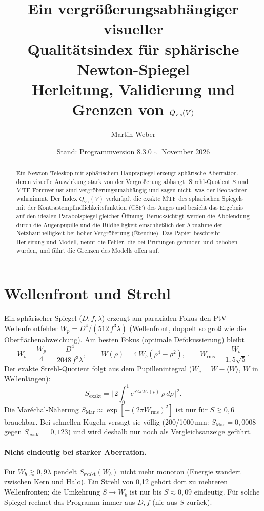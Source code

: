 \documentclass[11pt,a4paper]{article}
\title{Ein vergrößerungsabhängiger visueller\\Qualitätsindex für sphärische Newton-Spiegel\\[4pt]
\large Herleitung, Validierung und Grenzen von $\Qvis(V)$}
\author{Martin Weber}
\date{Stand: Programmversion 8.3.0 \quad$\cdot$\quad 8.\ November 2026}
\newcommand{\Qvis}{Q_{\mathrm{vis}}}
\begin{document}
\RaggedRight
\setlength{\parindent}{0pt}\setlength{\parskip}{4pt}
\maketitle

\begin{abstract}\RaggedRight
Ein Newton-Teleskop mit sphärischem Hauptspiegel erzeugt sphärische Aberration, deren visuelle Auswirkung stark von der Vergrößerung abhängt. Strehl-Quotient $S$ und MTF-Formverlust sind vergrößerungsunabhängig und sagen nicht, was der Beobachter wahrnimmt. Der Index $\Qvis(V)$ verknüpft die exakte MTF des sphärischen Spiegels mit der Kontrastempfindlichkeitsfunktion (CSF) des Auges und bezieht das Ergebnis auf den idealen Parabolspiegel gleicher Öffnung. Berücksichtigt werden die Abblendung durch die Augenpupille und die Bildhelligkeit einschließlich der Abnahme der Netzhauthelligkeit bei hoher Vergrößerung (Étendue). Das Papier beschreibt Herleitung und Modell, nennt die Fehler, die bei Prüfungen gefunden und behoben wurden, und führt die Grenzen des Modells offen auf.
\end{abstract}

\section{Wellenfront und Strehl}
Ein sphärischer Spiegel ($D,f,\lambda$) erzeugt am paraxialen Fokus den PtV-Wellenfrontfehler $W_p = D^4/(512\,f^3\lambda)$ (Wellenfront, doppelt so groß wie die Oberflächenabweichung). Am besten Fokus (optimale Defokussierung) bleibt
\begin{equation}
W_b=\frac{W_p}{4}=\frac{D^4}{2048\,f^3\lambda},\qquad W(\rho)=4\,W_b(\rho^4-\rho^2),\qquad W_{\mathrm{rms}}=\frac{W_b}{1{,}5\sqrt5}.
\end{equation}
Der exakte Strehl-Quotient folgt aus dem Pupillenintegral ($W_c=W-\langle W\rangle$, $W$ in Wellenlängen):
\begin{equation}
S_{\mathrm{exakt}}=\Big|\,2\int_0^1 e^{\,i2\pi W_c(\rho)}\,\rho\,d\rho\,\Big|^2 .
\end{equation}
Die Maréchal-Näherung $S_{\mathrm{Mar}}\approx\exp[-(2\pi W_{\mathrm{rms}})^2]$ ist nur für $S\gtrsim0{,}6$ brauchbar. Bei schnellen Kugeln versagt sie völlig (200/1000\,mm: $S_{\mathrm{Mar}}=0{,}0008$ gegen $S_{\mathrm{exakt}}=0{,}123$) und wird deshalb nur noch als Vergleichsanzeige geführt.

\paragraph{Nicht eindeutig bei starker Aberration.} Für $W_b\gtrsim0{,}9\lambda$ pendelt $S_{\mathrm{exakt}}(W_b)$ nicht mehr monoton (Energie wandert zwischen Kern und Halo). Ein Strehl von 0,12 gehört dort zu mehreren Wellenfronten; die Umkehrung $S\to W_b$ ist nur bis $S\approx0{,}09$ eindeutig. Für solche Spiegel rechnet das Programm immer aus $D,f$ (nie aus $S$ zurück).
\end{document}
